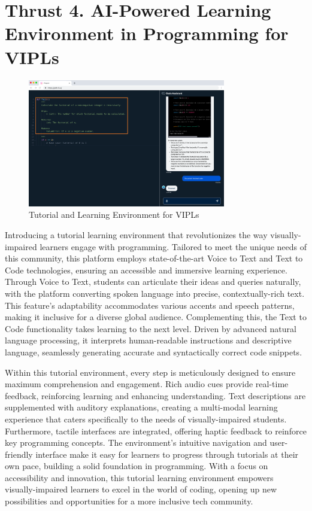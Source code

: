 \section{Thrust 4. AI-Powered Learning Environment in Programming for VIPLs}
\label{sec:thrust4}

\begin{figure}
\centering
\includegraphics[width=3.4in]{p4h-7}
\vspace{-6pt}
\caption{Tutorial and Learning Environment for VIPLs}
\label{auto-doc}
\end{figure}

Introducing a tutorial learning environment that revolutionizes the way visually-impaired learners engage with programming. Tailored to meet the unique needs of this community, this platform employs state-of-the-art Voice to Text and Text to Code technologies, ensuring an accessible and immersive learning experience. Through Voice to Text, students can articulate their ideas and queries naturally, with the platform converting spoken language into precise, contextually-rich text. This feature's adaptability accommodates various accents and speech patterns, making it inclusive for a diverse global audience. Complementing this, the Text to Code functionality takes learning to the next level. Driven by advanced natural language processing, it interprets human-readable instructions and descriptive language, seamlessly generating accurate and syntactically correct code snippets.


Within this tutorial environment, every step is meticulously designed to ensure maximum comprehension and engagement. Rich audio cues provide real-time feedback, reinforcing learning and enhancing understanding. Text descriptions are supplemented with auditory explanations, creating a multi-modal learning experience that caters specifically to the needs of visually-impaired students. Furthermore, tactile interfaces are integrated, offering haptic feedback to reinforce key programming concepts. The environment's intuitive navigation and user-friendly interface make it easy for learners to progress through tutorials at their own pace, building a solid foundation in programming. With a focus on accessibility and innovation, this tutorial learning environment empowers visually-impaired learners to excel in the world of coding, opening up new possibilities and opportunities for a more inclusive tech community.
